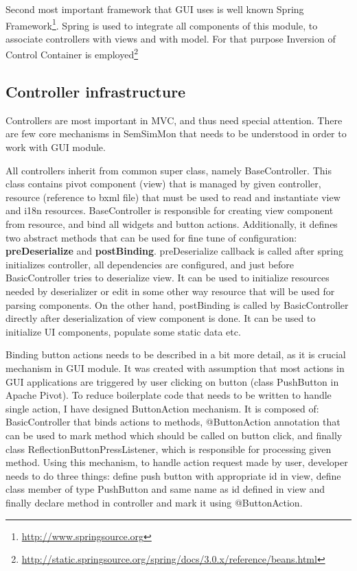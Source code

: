 Second most important framework that GUI uses is well known Spring Framework\footnote{\url{http://www.springsource.org}}. Spring is used to integrate all components of this module, to associate controllers with views and with model. For that purpose Inversion of Control Container is employed\footnote{\url{http://static.springsource.org/spring/docs/3.0.x/reference/beans.html}}

\subsection{Controller infrastructure}

Controllers are most important in MVC, and thus need special attention. There are few core mechanisms in SemSimMon that needs to be understood in order to work with GUI module. 

All controllers inherit from common super class, namely BaseController. This class contains pivot component (view) that is managed by given controller, resource (reference to bxml file) that must be used to read and instantiate view and i18n resources. BaseController is responsible for creating view component from resource, and bind all widgets and button actions. Additionally, it defines two abstract methods that can be used for fine tune of configuration: \textbf{preDeserialize} and \textbf{postBinding}. preDeserialize callback is called after spring initializes controller, all dependencies are configured, and just before BasicController tries to deserialize view. It can be used to initialize resources needed by deserializer or edit in some other way resource that will be used for parsing components. On the other hand, postBinding is called by BasicController directly after deserialization of view component is done. It can be used to initialize UI components, populate some static data etc.

Binding button actions needs to be described in a bit more detail, as it is crucial mechanism in GUI module. It was created with assumption that most actions in GUI applications are triggered by user clicking on button (class PushButton in Apache Pivot). To reduce boilerplate code that needs to be written to handle single action, I have designed ButtonAction mechanism. It is composed of: BasicController that binds actions to methods, @ButtonAction annotation that can be used to mark method which should be called on button click, and finally class ReflectionButtonPressListener, which is responsible for processing given method. Using this mechanism, to handle action request made by user, developer needs to do three things: define push button with appropriate id in view, define class member of type PushButton and same name as id defined in view and finally declare method in controller and mark it using @ButtonAction. 

